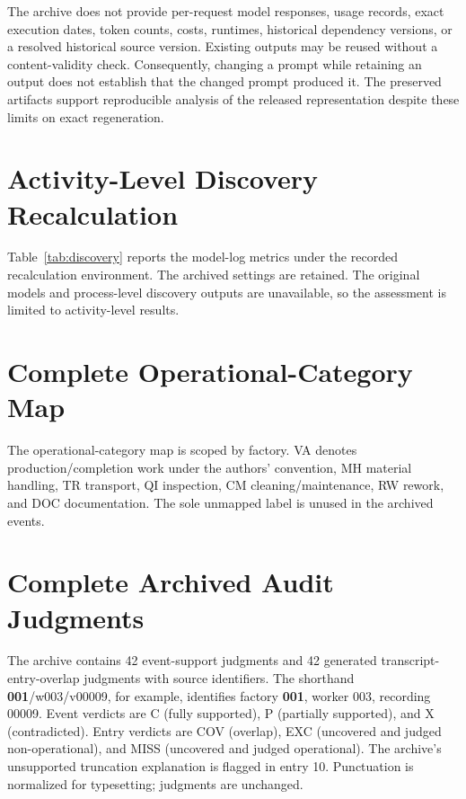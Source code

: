 The archive does not provide per-request model responses, usage records, exact execution dates, token counts, costs, runtimes, historical dependency versions, or a resolved historical source version. Existing outputs may be reused without a content-validity check. Consequently, changing a prompt while retaining an output does not establish that the changed prompt produced it. The preserved artifacts support reproducible analysis of the released representation despite these limits on exact regeneration.

\section{Activity-Level Discovery Recalculation}
\label{app:discovery}

Table~\ref{tab:discovery} reports the model-log metrics under the recorded recalculation environment. The archived settings are retained. The original models and process-level discovery outputs are unavailable, so the assessment is limited to activity-level results.

\section{Complete Operational-Category Map}
\label{app:mapping}
The operational-category map is scoped by factory. VA denotes production/completion work under the authors' convention, MH material handling, TR transport, QI inspection, CM cleaning/maintenance, RW rework, and DOC documentation. The sole unmapped label is unused in the archived events.


\section{Complete Archived Audit Judgments}
\label{app:audit}
The archive contains 42 event-support judgments and 42 generated transcript-entry-overlap judgments with source identifiers. The shorthand \textbf{001}/\allowbreak w003/\allowbreak v00009, for example, identifies factory \textbf{001}, worker 003, recording 00009. Event verdicts are C (fully supported), P (partially supported), and X (contradicted). Entry verdicts are COV (overlap), EXC (uncovered and judged non-operational), and MISS (uncovered and judged operational). The archive's unsupported truncation explanation is flagged in entry 10. Punctuation is normalized for typesetting; judgments are unchanged.

